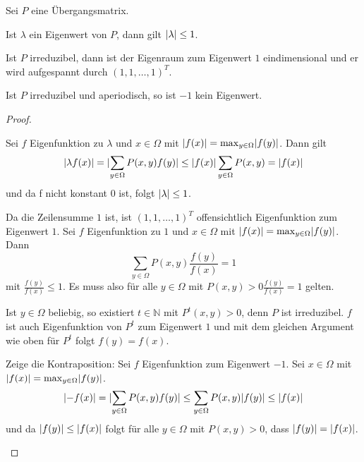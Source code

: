 \documentclass[ngerman,a4paper,11pt]{scrartcl}
\newcommand{\NN}{\mathbb{N}}
\DeclarePairedDelimiter{\abs}{\lvert}{\rvert}		%
\begin{document}
\begin{lem}
  Sei $P$ eine Übergangsmatrix.
  \begin{thmlist}
  \item Ist $\lambda$ ein Eigenwert von $P$, dann gilt $\abs{\lambda}\leq 1$.
  \item Ist $P$ irreduzibel, dann ist der Eigenraum zum Eigenwert $1$
    eindimensional und er wird aufgespannt durch $(1,1,\dotsc,1)^T$.
  \item Ist $P$ irreduzibel und aperiodisch, so ist $-1$ kein Eigenwert.\label{lem:apew}
  \end{thmlist}
\end{lem}
\begin{proof}
  \begin{thmlist}
  \item Sei $f$ Eigenfunktion zu $\lambda$ und $x\in\Omega$ mit
    $\abs{f(x)}=\max_{y\in\Omega}\abs{f(y)}$. Dann gilt
    \begin{equation*}
     \abs{\lambda f(x)}=\abs{\sum_{y\in\Omega}P(x,y)f(y)}\leq\abs{f(x)}\sum_{y\in\Omega}P(x,y)=\abs{f(x)} 
    \end{equation*}
    und da f nicht konstant $0$ ist, folgt $\abs{\lambda}\leq 1$.
  \item Da die Zeilensumme $1$ ist, ist $(1,1,\dotsc,1)^T$ offensichtlich
    Eigenfunktion zum Eigenwert $1$.
    Sei $f$ Eigenfunktion zu $1$ und $x\in\Omega$ mit
    $\abs{f(x)}=\max_{y\in\Omega}\abs{f(y)}$. Dann 
    \begin{equation*}
     \sum_{y\in\Omega}P(x,y)\frac{f(y)}{f(x)}=1 
    \end{equation*}
    mit $\frac{f(y)}{f(x)}\leq 1$. Es muss also für alle $y\in\Omega$ mit
    $P(x,y)>0$\quad$\frac{f(y)}{f(x)}=1$ gelten. 

Ist $y\in\Omega$ beliebig, so existiert $t\in\NN$ mit $P^t(x,y)>0$, denn
$P$ ist irreduzibel. $f$ ist auch Eigenfunktion von $P^t$ zum Eigenwert $1$ und mit dem gleichen Argument
wie oben für $P^t$ folgt $f(y)=f(x)$.
  \item Zeige die Kontraposition: Sei $f$ Eigenfunktion zum
    Eigenwert $-1$. Sei $x\in\Omega$ mit $\abs{f(x)}=\max_{y\in\Omega}\abs{f(y)}$.
    \begin{equation*}
     \abs{-f(x)}=\abs{\sum_{y\in\Omega}P(x,y)f(y)}\leq\sum_{y\in\Omega}P(x,y)\abs{f(y)}\leq\abs{f(x)}
    \end{equation*}
    und da $\abs{f(y)}\leq\abs{f(x)}$ folgt für alle $y\in\Omega$ mit
    $P(x,y)>0$, dass $\abs{f(y)}=\abs{f(x)}$. 


\end{thmlist}
\end{proof}
\end{document}

